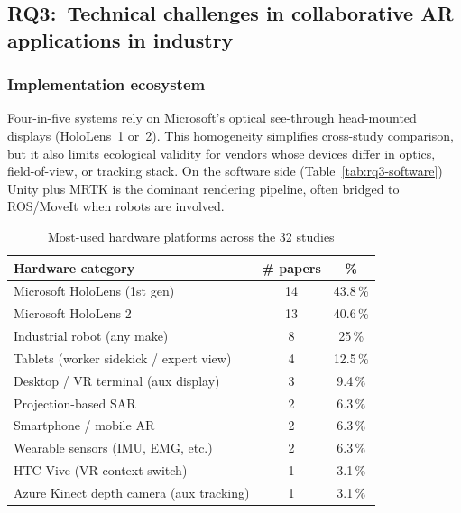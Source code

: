 \subsection{RQ3:~Technical challenges in collaborative AR applications in industry}
\label{sec:lit-rq3}

\subsubsection{Implementation ecosystem}

Four-in-five systems rely on Microsoft's optical see-through head-mounted displays (HoloLens~1 or~2).  This homogeneity simplifies cross-study comparison, but it also limits ecological validity for vendors whose devices differ in optics, field-of-view, or tracking stack.  On the software side (Table~\ref{tab:rq3-software}) Unity plus MRTK is the dominant rendering pipeline, often bridged to ROS/MoveIt when robots are involved.

\begin{table}[t!]
\centering
\caption{Most-used hardware platforms across the 32 studies}
\label{tab:rq3-hardware}
\begin{tabular}{@{}lcc@{}}
\toprule
\textbf{Hardware category} & \textbf{\# papers} & \textbf{\%} \\ \midrule
Microsoft HoloLens (1st gen)            & 14 & 43.8\,\% \\
Microsoft HoloLens 2                    & 13 & 40.6\,\% \\
Industrial robot (any make)             &  8 & 25\,\% \\
Tablets (worker sidekick / expert view) &  4 & 12.5\,\% \\
Desktop / VR terminal (aux display)     &  3 & 9.4\,\% \\
Projection-based SAR                    &  2 &  6.3\,\% \\
Smartphone / mobile AR                  &  2 &  6.3\,\% \\
Wearable sensors (IMU, EMG, etc.)       &  2 &  6.3\,\% \\
HTC Vive (VR context switch)            &  1 &  3.1\,\% \\
Azure Kinect depth camera (aux tracking)&  1 &  3.1\,\% \\ \bottomrule
\end{tabular}
\end{table}

